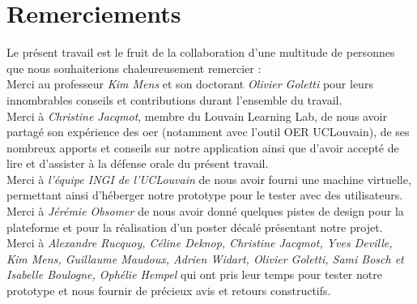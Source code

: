 \chapter*{Remerciements}

Le présent travail est le fruit de la collaboration d'une multitude de personnes que nous souhaiterions chaleureusement remercier : \\

Merci au professeur \textit{Kim Mens} et son doctorant \textit{Olivier Goletti} pour leurs innombrables conseils et contributions durant l'ensemble du travail. \\

Merci à \textit{Christine Jacqmot}, membre du Louvain Learning Lab, de nous avoir partagé son expérience des \Gls{oer} (notamment avec l'outil OER UCLouvain), de ses nombreux apports et conseils sur notre application ainsi que d'avoir accepté de lire et d'assister à la défense orale du présent travail.\\

Merci à \textit{l'équipe INGI de l'UCLouvain} de nous avoir fourni une machine virtuelle, permettant ainsi d'héberger notre prototype pour le tester avec des utilisateurs. \\

Merci à \textit{Jérémie Obsomer} de nous avoir donné quelques pistes de design pour la plateforme et pour la réalisation d'un poster décalé  présentant notre projet.\\

Merci à \textit{Alexandre Rucquoy, Céline Deknop, Christine Jacqmot, Yves Deville, Kim Mens, Guillaume Maudoux, Adrien Widart, Olivier Goletti, Sami Bosch et Isabelle Boulogne, Ophélie Hempel} qui ont pris leur temps pour tester notre prototype et nous fournir de précieux avis et retours constructifs.